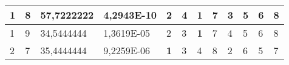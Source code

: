 \documentclass[conference]{IEEEtran}
\begin{document}
\begin{table*}[]
\begin{tabular}{|llll|llllllll|}
\multicolumn{1}{|l|}{1}                                                     & \multicolumn{1}{l|}{8}                                                        & \multicolumn{1}{l|}{57,7222222}                                                   & 4,2943E-10                     & \multicolumn{1}{l|}{2}                                                  & \multicolumn{1}{l|}{4}                                                  & \multicolumn{1}{l|}{\textbf{1}}                                         & \multicolumn{1}{l|}{7}                                                  & \multicolumn{1}{l|}{3}                                                  & \multicolumn{1}{l|}{5}                                                  & \multicolumn{1}{l|}{6}                                                  & 8                          \\ \hline
\multicolumn{1}{|l|}{1}                                                     & \multicolumn{1}{l|}{9}                                                        & \multicolumn{1}{l|}{34,5444444}                                                   & 1,3619E-05                     & \multicolumn{1}{l|}{2}                                                  & \multicolumn{1}{l|}{3}                                                  & \multicolumn{1}{l|}{\textbf{1}}                                         & \multicolumn{1}{l|}{7}                                                  & \multicolumn{1}{l|}{4}                                                  & \multicolumn{1}{l|}{5}                                                  & \multicolumn{1}{l|}{6}                                                  & 8                          \\ \hline
\multicolumn{1}{|l|}{2}                                                     & \multicolumn{1}{l|}{7}                                                        & \multicolumn{1}{l|}{35,4444444}                                                   & 9,2259E-06                     & \multicolumn{1}{l|}{\textbf{1}}                                         & \multicolumn{1}{l|}{3}                                                  & \multicolumn{1}{l|}{4}                                                  & \multicolumn{1}{l|}{8}                                                  & \multicolumn{1}{l|}{2}                                                  & \multicolumn{1}{l|}{6}                                                  & \multicolumn{1}{l|}{5}                                                  & 7                          \\ \hline

\end{tabular}
\end{table*}
\end{document}
